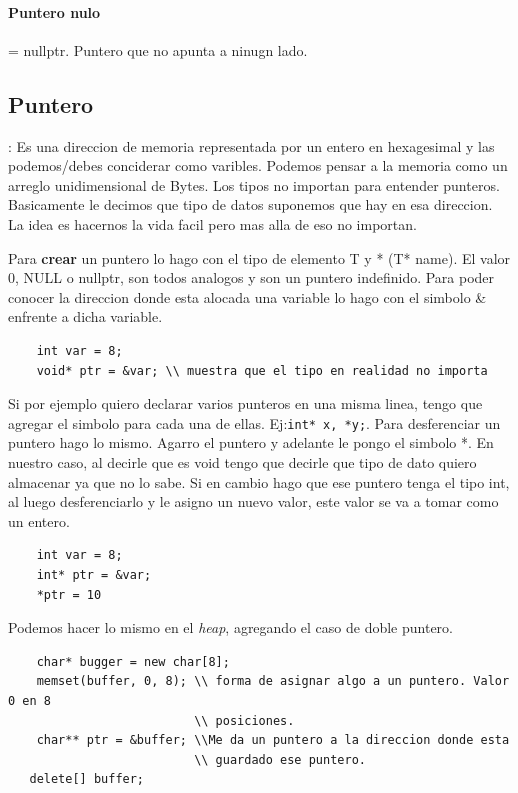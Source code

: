 \documentclass[11pt]{article}
\begin{document}
\paragraph{Puntero nulo} = nullptr.
Puntero que no apunta a ninugn lado.
\subsection{Puntero}: Es una direccion de memoria representada por un entero en
hexagesimal y las podemos/debes conciderar como varibles.
Podemos pensar a la memoria como un arreglo unidimensional de Bytes.
Los tipos no importan para entender punteros.
Basicamente le decimos que tipo de datos suponemos que hay en esa direccion.
La idea es hacernos la vida facil pero mas alla de eso no importan.

Para \textbf{crear} un puntero lo hago con el tipo de elemento T y * (T* name).
El valor 0, NULL o nullptr, son todos analogos y son un puntero indefinido.
Para poder conocer la direccion donde esta alocada una variable lo hago con el simbolo
\& enfrente a dicha variable.
\begin{lstlisting}
    int var = 8;
    void* ptr = &var; \\ muestra que el tipo en realidad no importa
\end{lstlisting}

Si por ejemplo quiero declarar varios punteros en una misma linea,
tengo que agregar el simbolo para cada una de ellas.
Ej:\texttt{int* x, *y;}.
Para desferenciar un puntero hago lo mismo.
Agarro el puntero y adelante le pongo el simbolo *.
En nuestro caso, al decirle que es void tengo que decirle que tipo de dato
quiero almacenar ya que no lo sabe.
Si en cambio hago que ese puntero tenga el tipo int, al luego desferenciarlo y
le asigno un nuevo valor, este valor se va a tomar como un entero.

\begin{lstlisting}
    int var = 8;
    int* ptr = &var;
    *ptr = 10
\end{lstlisting}

Podemos hacer lo mismo en el \textit{heap}, agregando el caso de doble puntero.
\begin{lstlisting}
    char* bugger = new char[8];
    memset(buffer, 0, 8); \\ forma de asignar algo a un puntero. Valor 0 en 8
                          \\ posiciones.
    char** ptr = &buffer; \\Me da un puntero a la direccion donde esta
                          \\ guardado ese puntero.
   delete[] buffer;
\end{lstlisting}
\end{document}
